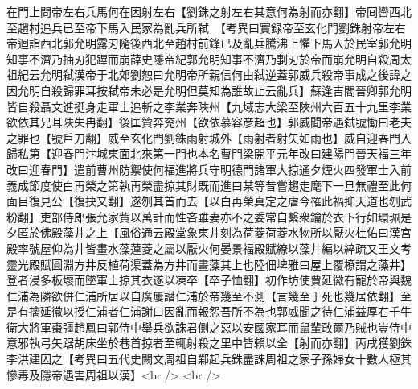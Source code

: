 在門上問帝左右兵馬何在因射左右【劉銖之射左右其意何為射而亦翻】帝囘轡西北至趙村追兵已至帝下馬入民家為亂兵所弑　【考異曰實録帝至玄化門劉銖射帝左右帝迴詣西北郭允明露刃隨後西北至趙村前鋒已及亂兵騰沸上懼下馬入於民室郭允明知事不濟乃抽刃犯蹕而崩薛史隱帝紀郭允明知事不濟乃剚刃於帝而崩允明自殺周太祖紀云允明弑漢帝于北郊劉恕曰允明帝所親信何由弑逆蓋郭威兵殺帝事成之後諱之因允明自殺歸罪耳按弑帝未必是允明但莫知為誰故止云亂兵】蘇逢吉閻晉卿郭允明皆自殺聶文進挺身走軍士追斬之李業奔陜州【九域志大梁至陜州六百五十九里李業欲依其兄耳陜失冉翻】後匡贊奔兖州【欲依慕容彦超也】郭威聞帝遇弑號慟曰老夫之罪也【號戶刀翻】威至玄化門劉銖雨射城外【雨射者射矢如雨也】威自迎春門入歸私第【迎春門汴城東面北來第一門也本名曹門梁開平元年改曰建陽門晉天福三年改曰迎春門】遣前曹州防禦使何福進將兵守明德門諸軍大掠通夕煙火四發軍士入前義成節度使白再榮之第執再榮盡掠其財既而進曰某等昔嘗趨走麾下一旦無禮至此何面目復見公【復抉又翻】遂刎其首而去【以白再榮真定之虐今罹此禍抑天道也刎武粉翻】吏部侍郎張允家貲以萬計而性吝雖妻亦不之委常自繫衆鑰於衣下行如環珮是夕匿於佛殿藻井之上【風俗通云殿堂象東井刻為荷菱荷菱水物所以厭火杜佑曰漢宫殿率號屋仰為井皆畫水藻蓮菱之屬以厭火何晏景福殿賦繚以藻井編以綷疏又王文考靈光殿賦圓淵方井反植荷渠蓋為方井而畫藻其上也陸佃埤雅曰屋上覆橑謂之藻井】登者浸多板壞而墜軍士掠其衣遂以凍卒【卒子恤翻】初作坊使賈延徽有寵於帝與魏仁浦為隣欲併仁浦所居以自廣屢譖仁浦於帝幾至不測【言幾至于死也幾居依翻】至是有擒延徽以授仁浦者仁浦謝曰因亂而報怨吾所不為也郭威聞之待仁浦益厚右千牛衛大將軍棗彊趙鳳曰郭侍中舉兵欲誅君側之惡以安國家耳而鼠輩敢爾乃賊也豈侍中意邪執弓矢踞胡床坐於巷首掠者至輒射殺之里中皆賴以全【射而亦翻】丙戌獲劉銖李洪建囚之【考異曰五代史闕文周祖自鄴起兵銖盡誅周祖之家子孫婦女十數人極其慘毒及隱帝遇害周祖以漢】<br />
<br />
